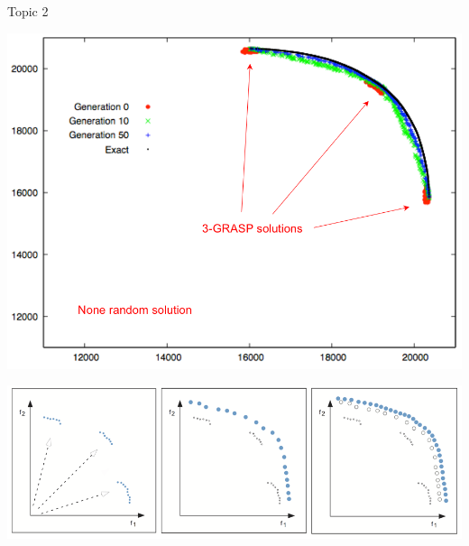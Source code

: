 \documentclass[10pt,xcolor=dvipsnames]{beamer}
\begin{document}
\begin{frame}{Topic 2}

\centering
\includegraphics[scale=0.2]{lambdaGRASP.png}
\vspace{3mm}

\includegraphics[scale=0.25]{psg.png}

\end{frame}
\end{document}
